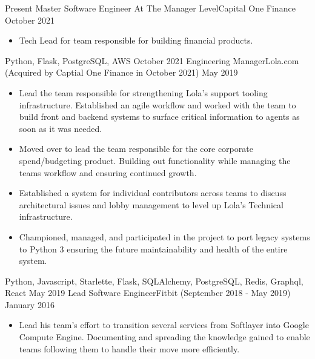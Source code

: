 %
%
%
\begin{experiences}
  \experience
  {Present}  {Master Software Engineer At The Manager Level}{Capital One Finance}
  {October 2021}   {
                      \begin{itemize}
                        \item Tech Lead for team responsible for building financial products.
                      \end{itemize}
                  }
                  {Python, Flask, PostgreSQL, AWS}
  \emptySeparator
  \experience
  {October 2021}  {Engineering Manager}{Lola.com (Acquired by Captial One Finance in October 2021)}
  {May 2019}   {
                      \begin{itemize}
                        \item Lead the team responsible for strengthening Lola's support tooling infrastructure. Established an agile workflow and worked with the team to build front and backend systems to surface critical information to agents as soon as it was needed.
                        \item Moved over to lead the team responsible for the core corporate spend/budgeting product. Building out functionality while managing the teams workflow and ensuring continued growth.
                        \item Established a system for individual contributors across teams to discuss architectural issues and lobby management to level up Lola's Technical infrastructure. 
                        \item Championed, managed, and participated in the project to port legacy systems to Python 3 ensuring the future maintainability and health of the entire system.
                      \end{itemize}
                  }
                  {Python, Javascript, Starlette, Flask, SQLAlchemy, PostgreSQL, Redis, Graphql, React}
  \emptySeparator
  \experience
  {May 2019}  {Lead Software Engineer}{Fitbit {\footnotesize (September 2018 - May 2019)}}
  {January 2016}   {
                      \begin{itemize}
                        \item Lead his team’s effort to transition several services from Softlayer into Google Compute Engine. Documenting and spreading the knowledge gained to enable teams following them to handle their move more efficiently.

\end{itemize}}
\end{experiences}
